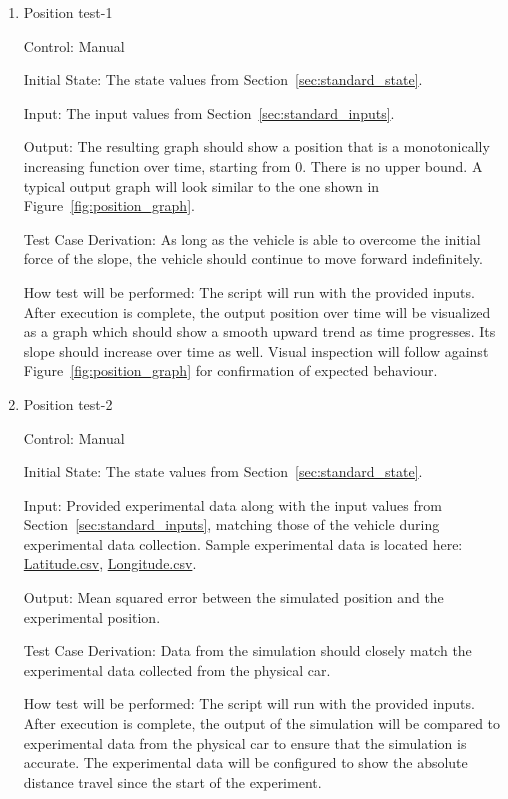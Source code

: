 \documentclass[12pt, titlepage]{article}
\begin{document}
\begin{enumerate}
  
  \item{Position test-1\\}
  
  Control: Manual
            
  Initial State: The state values from Section~\ref{sec:standard_state}.
  
  Input: The input values from Section~\ref{sec:standard_inputs}.
            
  Output: The resulting graph should show a position that is a monotonically increasing function over time, starting from 0. There is no upper bound. A typical output graph will look similar to the one shown in Figure~\ref{fig:position_graph}.
  
  Test Case Derivation: As long as the vehicle is able to overcome the initial force of the slope, the vehicle should continue to move forward indefinitely.
  
  How test will be performed: The script will run with the provided inputs. After execution is complete, the output position over time will be visualized as a graph which should show a smooth upward trend as time progresses. Its slope should increase over time as well. Visual inspection will follow against Figure~\ref{fig:position_graph} for confirmation of expected behaviour.
  
  \item{Position test-2\\}

  Control: Manual

  Initial State: The state values from Section~\ref{sec:standard_state}.
  
  Input: Provided experimental data along with the input values from Section~\ref{sec:standard_inputs}, matching those of the vehicle during experimental data collection. Sample experimental data is located here: \href{https://github.com/gr812b/CVT-Simulator/experimental-data/GPS%20LATITUDE.csv}{Latitude.csv}, \href{https://github.com/gr812b/CVT-Simulator/experimental-data/GPS%20LONGITUDE.csv}{Longitude.csv}.

  Output: Mean squared error between the simulated position and the experimental position.

  Test Case Derivation: Data from the simulation should closely match the experimental data collected from the physical car.

  How test will be performed: The script will run with the provided inputs. After execution is complete, the output of the simulation will be compared to experimental data from the physical car to ensure that the simulation is accurate. The experimental data will be configured to show the absolute distance travel since the start of the experiment.

\end{enumerate}
		
\end{document}
